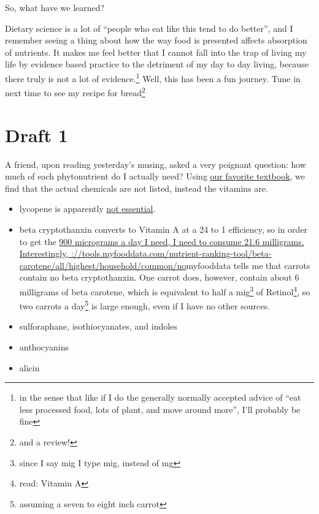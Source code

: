 \documentclass[12pt]{article}[titlepage]
\newcommand{\say}[1]{``#1''}
\renewcommand{\,}{\textsuperscript{,}}
\begin{document}
So, what have we learned?

Dietary science is a lot of \say{people who eat like this tend to do better}, and I remember seeing a thing about how the way food is presented affects absorption of nutrients.  
It makes me feel better that I cannot fall into the trap of living my life by evidence based practice to the detriment of my day to day living, because there truly is not a lot of evidence.\footnote{in the sense that like if I do the generally normally accepted advice of \say{eat less processed food, lots of plant, and move around more}, I'll probably be fine}  
Well, this has been a fun journey.  
Tune in next time to see my recipe for bread\footnote{and a review!}

  


\section{Draft 1}  
A friend, upon reading yesterday's musing, asked a very poignant question: how much of each phytonutrient do I actually need?  
Using \href{https://nap.nationalacademies.org/read/11537/chapter/59}{our favorite textbook}, we find that the actual chemicals are not listed, instead the vitamins are.  


\begin{itemize}  
\item lycopene is apparently \href{https://lpi.oregonstate.edu/mic/dietary-factors/phytochemicals/carotenoids}{not essential}.  
\item beta cryptothanxin converts to Vitamin A at a 24 to 1 efficiency, so in order to get the \href{https://nap.nationalacademies.org/read/11537/chapter/17}{900 micrograms a day I need, I need to consume 21.6 milligrams. Interestingly, \https://tools.myfooddata.com/nutrient-ranking-tool/beta-carotene/all/highest/household/common/no}{myfooddata tells me} that carrots contain no beta cryptothanxin. One carrot does, however, contain about 6 milligrams of beta carotene, which is equivalent to half a mig\footnote{since I say mig I type mig, instead of mg} of Retinol\footnote{read: Vitamin A}, so two carrots a day\footnote{assuming a seven to eight inch carrot} is large enough, even if I have no other sources.  
\item sulforaphane, isothiocyanates, and indoles  
\item anthocyanins  
\item alicin  
\end{itemize}
\end{document}
